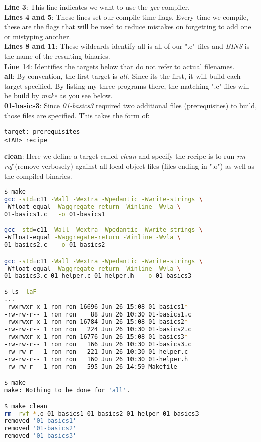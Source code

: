 \documentclass[../main.tex]{subfiles}
\begin{document}
\textbf{Line 3}: This line indicates we want to use the \textit{gcc} compiler.\\
\textbf{Lines 4 and 5}: These lines set our compile time flags.  Every time we compile, these are the flags that will be used to reduce mistakes on forgetting to add one or mistyping another.\\
\textbf{Lines 8 and 11}: These wildcards identify all is all of our ".c" files and \textit{BINS} is the name of the resulting binaries.\\
\textbf{Line 14}: Identifies the targets below that do not refer to actual filenames.\\
\textbf{all}: By convention, the first target is \textit{all}.  Since its the first, it will build each target specified.  By listing my three programs there, the matching ".c" files will be build by \textit{make} as you see below.\\
\textbf{01-basics3}: Since \textit{01-basics3} required two additional files (prerequisites) to build, those files are specified.  This takes the form of:
\begin{verbatim}
target: prerequisites
<TAB> recipe
\end{verbatim}

\textbf{clean}: Here we define a target called \textit{clean} and specify the recipe is to run \textit{rm -rvf} (remove verbosely) against all local object files (files ending in ".o") as well as the compiled binaries.\\
\begin{lstlisting}[language=bash]
$ make
gcc -std=c11 -Wall -Wextra -Wpedantic -Wwrite-strings \
-Wfloat-equal -Waggregate-return -Winline -Wvla \
01-basics1.c   -o 01-basics1

gcc -std=c11 -Wall -Wextra -Wpedantic -Wwrite-strings \
-Wfloat-equal -Waggregate-return -Winline -Wvla \
01-basics2.c   -o 01-basics2

gcc -std=c11 -Wall -Wextra -Wpedantic -Wwrite-strings \
-Wfloat-equal -Waggregate-return -Winline -Wvla \
01-basics3.c 01-helper.c 01-helper.h   -o 01-basics3

$ ls -laF
...
-rwxrwxr-x 1 ron ron 16696 Jun 26 15:08 01-basics1*
-rw-rw-r-- 1 ron ron    88 Jun 26 10:30 01-basics1.c
-rwxrwxr-x 1 ron ron 16784 Jun 26 15:08 01-basics2*
-rw-rw-r-- 1 ron ron   224 Jun 26 10:30 01-basics2.c
-rwxrwxr-x 1 ron ron 16776 Jun 26 15:08 01-basics3*
-rw-rw-r-- 1 ron ron   166 Jun 26 10:30 01-basics3.c
-rw-rw-r-- 1 ron ron   221 Jun 26 10:30 01-helper.c
-rw-rw-r-- 1 ron ron   160 Jun 26 10:30 01-helper.h
-rw-rw-r-- 1 ron ron   595 Jun 26 14:59 Makefile

$ make
make: Nothing to be done for 'all'.

$ make clean
rm -rvf *.o 01-basics1 01-basics2 01-helper 01-basics3
removed '01-basics1'
removed '01-basics2'
removed '01-basics3'
\end{lstlisting}
\end{document}
